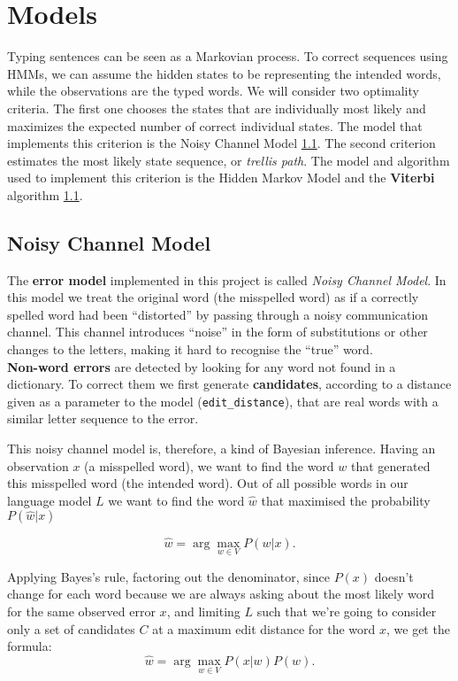 \chapter{Models}

Typing sentences can be seen as a Markovian process. To correct sequences using HMMs, we can assume the 
hidden states to be representing the intended words, while the observations are the typed words.
We will consider two optimality criteria. The first one chooses the states that are individually most likely and 
maximizes the expected number of correct individual states. The model that implements this criterion is the 
Noisy Channel Model \ref{}.
The second criterion estimates the most likely state sequence, or \textit{trellis path}. The model and algorithm 
used to implement this criterion is the Hidden Markov Model and the \textbf{Viterbi} algorithm \ref{}.


\section{Noisy Channel Model}
The \textbf{error model} implemented in this project is called \textit{Noisy Channel Model}.
In this model we treat the original word (the misspelled word) as if a correctly spelled word had been “distorted” 
by passing through  a noisy communication channel. This channel introduces “noise” in the form of substitutions 
or other changes to the letters, making it hard to recognise the “true” word. \\


\textbf{Non-word errors} are detected by looking for any word not found in a dictionary. To correct them we first 
generate \textbf{candidates}, according to a distance given as a parameter to the model (\texttt{edit\_distance}), 
that are real words with a similar letter sequence to the error. 


This noisy channel model is, therefore, a kind of Bayesian inference.
Having an observation $x$ (a misspelled word), we want to find the word $w$ that generated this misspelled word (the intended word).
Out of all possible words in our language model $L$ we want to find the word $\hat{w}$ that maximised the 
probability $P(\hat{w}|x)$

\begin{equation}\label{eq:4.1}
\hat{w} = \arg\max_{w \in V} P(w|x) \mbox{.}
\end{equation}

Applying Bayes's rule, factoring out the denominator, since $P(x)$ doesn’t change for each word because we 
are always asking about the most likely word for the same observed error $x$,  and limiting $L$ such that we're 
going to consider only a set of candidates $C$ at a maximum edit distance for the word $x$, we get the formula:
\begin{equation}\label{eq:4.2}
\hat{w} = \arg\max_{w \in V} {P(x|w)P(w)} \mbox{.}
\end{equation}

